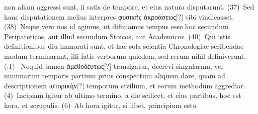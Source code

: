 \documentclass[draft,12pt,twoside,a4paper]{book}
\newcounter{sourcepagenr}
\newcounter{pdfpagenr}
\newcommand{\lnr}[1]{\nrfont({#1})~\normalfont}
\newcommand{\plnr}[3]{%
	\setcounter{pdfpagenr}{{#1}}%
	\setcounter{sourcepagenr}{{#2}}%
	\nrfont(\arabic{sourcepagenr}:{{#3}})~\normalfont%
}
\begin{document}
non aliam aggressi sunt, ii satis de tempore, et eius natura
disputarunt.
\lnr{37}Sed hanc disputationem melius interpres
 \textgreek{φυσικῆς ἀκροάσεως[?]}
sibi vindicasset.
\lnr{38}Neque vero nos id agimus, ut difiniamus
tempus esse hoc secundum Peripateticos, aut illud secundum Stoicos,
aut Academicos.
\lnr{40}Qui istis definitionibus diu immorati sunt, et hac
sola scientia Chronologiae scribendae modum terminarunt, illi fatis
verborum quiedem, sed rerum nihil definiverunt.
%
\plnr{87}{4}{1}Nequid tamen
\textgreek{ἀμεθοδέυτως[?]} transigatur, decrevi singularum, vel
 minimarum temporis
partium prius conspectum aliquem dare, quam ad descriptionem
\textgreek{ἱστορικὴν[?]} temporum civilium, et eorum methodum aggrediar.
\lnr{4}Incipiam igitur ab ultimo termino, a die scilicet, et eius partibus,
hoc est hora, et scrupulis.
\lnr{6}Ab hora igitur, si libet, principium esto.
\end{document}

